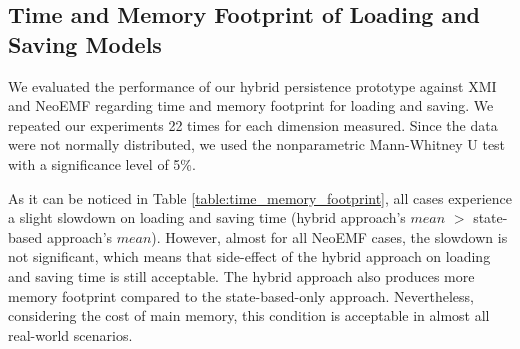 \documentclass{llncs}
\begin{document}
\vspace{-25pt}
\subsection{Time and Memory Footprint of Loading and Saving Models}
\label{sec:model_loading_time}

\vspace{-10pt}
We evaluated the performance of our hybrid persistence prototype against XMI and NeoEMF regarding time and memory footprint for loading and saving. We repeated our experiments 22 times for each dimension measured. Since the data were not normally distributed, we used the nonparametric Mann-Whitney U test \cite{doi:10.1002/9780470479216.corpsy0524} with a significance level of 5\%. 

As it can be noticed in Table \ref{table:time_memory_footprint}, all cases experience a slight slowdown on loading and saving time (hybrid approach's $mean$ $>$ state-based approach's $mean$). However, almost for all NeoEMF cases, the slowdown is not significant, which means that side-effect of the hybrid approach on loading and saving time is still acceptable. The hybrid approach also produces more memory footprint compared to the state-based-only approach. Nevertheless, considering the cost of main memory, this condition is acceptable in almost all real-world scenarios.


  
\end{document}
